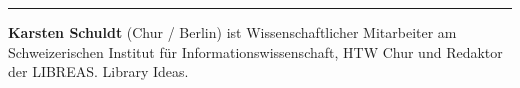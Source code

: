 \begin{center}\rule{0.5\linewidth}{\linethickness}\end{center}

\textbf{Karsten Schuldt} (Chur / Berlin) ist Wissenschaftlicher
Mitarbeiter am Schweizerischen Institut für Informationswissenschaft,
HTW Chur und Redaktor der LIBREAS. Library Ideas.
